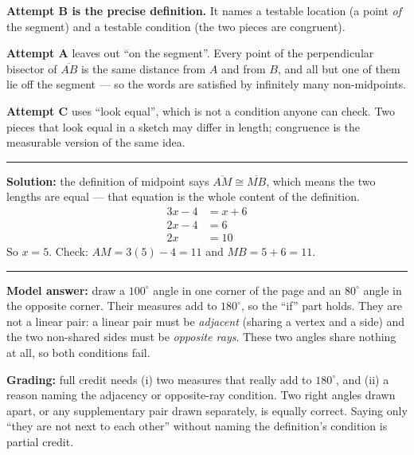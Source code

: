 \documentclass[12pt]{article}
\begin{document}



\textbf{Attempt B is the precise definition.} It names a testable location (a point \emph{of} the segment) and a testable condition (the two pieces are congruent).

\textbf{Attempt A} leaves out ``on the segment''. Every point of the perpendicular bisector of $\overline{AB}$ is the same distance from $A$ and from $B$, and all but one of them lie off the segment --- so the words are satisfied by infinitely many non-midpoints.

\textbf{Attempt C} uses ``look equal'', which is not a condition anyone can check. Two pieces that look equal in a sketch may differ in length; congruence is the measurable version of the same idea.

\vspace{0.2cm}\noindent\rule{\linewidth}{0.2pt}


\textbf{Solution:} the definition of midpoint says $\overline{AM} \cong \overline{MB}$, which means the two lengths are equal --- that equation is the whole content of the definition.
\begin{align*}
  3x - 4 &= x + 6 \\
  2x - 4 &= 6 \\
  2x &= 10
\end{align*}
So $x = 5$. Check: $AM = 3(5) - 4 = 11$ and $MB = 5 + 6 = 11$. 

\vspace{0.2cm}\noindent\rule{\linewidth}{0.2pt}


\textbf{Model answer:} draw a $100^\circ$ angle in one corner of the page and an $80^\circ$ angle in the opposite corner. Their measures add to $180^\circ$, so the ``if'' part holds. They are not a linear pair: a linear pair must be \emph{adjacent} (sharing a vertex and a side) and the two non-shared sides must be \emph{opposite rays}. These two angles share nothing at all, so both conditions fail.

\textbf{Grading:} full credit needs (i) two measures that really add to $180^\circ$, and (ii) a reason naming the adjacency or opposite-ray condition. Two right angles drawn apart, or any supplementary pair drawn separately, is equally correct. Saying only ``they are not next to each other'' without naming the definition's condition is partial credit.
\end{document}

